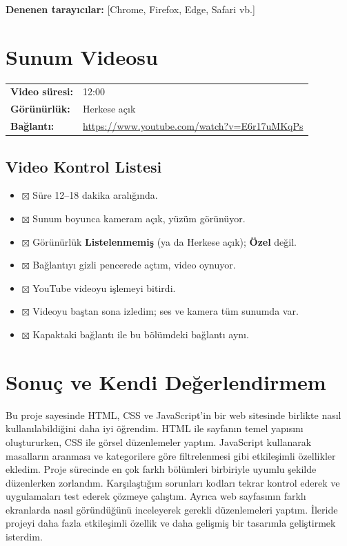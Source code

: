\documentclass[12pt,a4paper]{article}
\newcommand{\aciklama}[1]{{\color{gray}\itshape (#1)}}
\newcommand{\youtubelink}{\url{https://www.youtube.com/watch?v=E6r17uMKqPs}}
\begin{document}
\textbf{Denenen tarayıcılar:} [Chrome, Firefox, Edge, Safari vb.]

\section{Sunum Videosu}
\begin{center}
\begin{tabular}{@{}ll@{}}
\textbf{Video süresi:} & 12:00 \quad \aciklama{12--18 dakika olmalıdır} \\
\textbf{Görünürlük:} & Herkese açık \\
\textbf{Bağlantı:} & \youtubelink \\
\end{tabular}
\end{center}

\subsection{Video Kontrol Listesi}
\begin{itemize}
  \item $\boxtimes$ Süre 12--18 dakika aralığında.
  \item $\boxtimes$ Sunum boyunca kameram açık, yüzüm görünüyor.
  \item $\boxtimes$ Görünürlük \textbf{Listelenmemiş} (ya da Herkese açık); \textbf{Özel} değil.
  \item $\boxtimes$ Bağlantıyı gizli pencerede açtım, video oynuyor.
  \item $\boxtimes$ YouTube videoyu işlemeyi bitirdi.
  \item $\boxtimes$ Videoyu baştan sona izledim; ses ve kamera tüm sunumda var.
  \item $\boxtimes$ Kapaktaki bağlantı ile bu bölümdeki bağlantı aynı.
\end{itemize}

\section{Sonuç ve Kendi Değerlendirmem}


Bu proje sayesinde HTML, CSS ve JavaScript'in bir web sitesinde birlikte nasıl kullanılabildiğini daha iyi öğrendim. HTML ile sayfanın temel yapısını oluştururken, CSS ile görsel düzenlemeler yaptım. JavaScript kullanarak masalların aranması ve kategorilere göre filtrelenmesi gibi etkileşimli özellikler ekledim. Proje sürecinde en çok farklı bölümleri birbiriyle uyumlu şekilde düzenlerken zorlandım. Karşılaştığım sorunları kodları tekrar kontrol ederek ve uygulamaları test ederek çözmeye çalıştım. Ayrıca web sayfasının farklı ekranlarda nasıl göründüğünü inceleyerek gerekli düzenlemeleri yaptım. İleride projeyi daha fazla etkileşimli özellik ve daha gelişmiş bir tasarımla geliştirmek isterdim.
\end{document}
